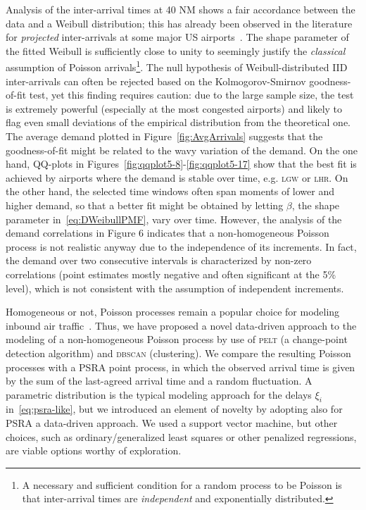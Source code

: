 \documentclass[draft,review]{elsarticle}
\makeatletter
\newcommand*{\eg}{e.g.\@\xspace}
\newcommand{\PELT}{\textsc{pelt}}
\newcommand{\DBSCAN}{\textsc{dbscan}}
\newcommand{\airp}[1]{\textcolor{#1}{\textsc{#1}}}
\makeatother
\begin{document}
  Analysis of the inter-arrival times at 40 NM shows a fair accordance between the data and a Weibull distribution; this has already been observed in the literature for \emph{projected} inter-arrivals at some major US airports~\citep{willemain2004statistical}.
  The shape parameter of the fitted Weibull is sufficiently close to unity to seemingly justify the \emph{classical} assumption of Poisson arrivals\footnote{A necessary and sufficient condition for a random process to be Poisson is that inter-arrival times are \emph{independent} and exponentially distributed.}.
  The null hypothesis of Weibull-distributed \ac{IID} inter-arrivals can often be rejected based on the Kolmogorov-Smirnov goodness-of-fit test, yet this finding requires caution: due to the large sample size, the test is extremely powerful (especially at the most congested airports) and likely to flag even small deviations of the empirical distribution from the theoretical one.
  The average demand plotted in Figure~\ref{fig:AvgArrivals} suggests that the goodness-of-fit might be related to the wavy variation of the demand.
  On the one hand, QQ-plots in Figures~\ref{fig:qqplot5-8}-\ref{fig:qqplot5-17} show that the best fit is achieved by airports where the demand is stable over time, \eg{} \airp{lgw} or \airp{lhr}.
  On the other hand, the selected time windows often span moments of lower and higher demand, so that a better fit might be obtained by letting $\beta$, the shape parameter in~\eqref{eq:DWeibullPMF}, vary over time.
  However, the analysis of the demand correlations in Figure 6 indicates that a non-homogeneous Poisson process is not realistic anyway due to the independence of its increments. In fact, the demand over two consecutive intervals is characterized by non-zero correlations (point estimates mostly negative and often significant at the 5\% level), which is not consistent with the assumption of independent increments.

  Homogeneous or not, Poisson processes remain a popular choice for modeling inbound air traffic~\citep{gwiggner2014data}.
  Thus, we have proposed a novel data-driven approach to the modeling of a non-homogeneous Poisson process by use of \PELT{} (a change-point detection algorithm) and \DBSCAN{} (clustering).
  We compare the resulting Poisson processes with a \ac{PSRA} point process, in which the observed arrival time is given by the sum of the last-agreed arrival time and a random fluctuation.
  A parametric distribution is the typical modeling approach for the delays \(\xi_i\) in~\eqref{eq:psra-like}, but we introduced an element of novelty by adopting also for \ac{PSRA} a data-driven approach.
  We used a support vector machine, but other choices, such as ordinary/generalized least squares or other penalized regressions, are viable options worthy of exploration.
\end{document}

